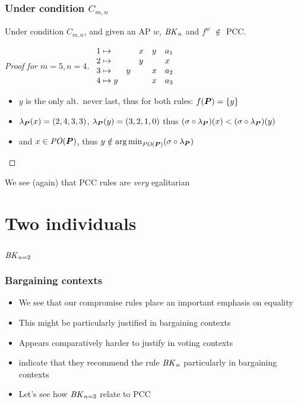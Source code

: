 \documentclass[french, english]{beamer}
\begin{document}
\begin{frame}
	\frametitle{Under condition \texorpdfstring{$C_{m, n}$}{C(m, n)}}
	\begin{theorem}
		Under condition $C_{m, n}$, and  given an AP $w$, $\BK[n]$ and $f^w$ $\notin$ PCC.
	\end{theorem}
	\begin{proof}[Proof for $m = 5, n = 4$]
		$\begin{array}{r@{\hspace{1mm} \mapsto \hspace{1mm}}lllll}
			1 &	&	&x	&y	&a_1\\%
			2 &	&	&y	&	&x\\%
			3 &	&y	&	&x	&a_2\\%
			4 &y	&	&	&x	&a_3\\%
		\end{array}$%
		\begin{itemize}
			\item $y$ is the only alt.\ never last, thus for both rules: $f(\boldsymbol{P}) = \{y\}$
			\item $\lambda_{\bm{P}}(x) = (2, 4, 3, 3)$, $\lambda_{\bm{P}}(y) = (3, 2, 1, 0)$ thus $(\sigma \circ \lambda_{\bm{P}})(x) < (\sigma \circ \lambda_{\bm{P}})(y)$
			\item and $x \in \mathit{PO}(\boldsymbol{P})$, thus $y \notin \operatorname*{arg\,min}_{\mathit{PO}(\boldsymbol{P})}(\sigma \circ \lambda_{\bm{P}})$ \qedhere
		\end{itemize}
	\end{proof}
	We see (again) that PCC rules are \emph{very} egalitarian
\end{frame}

\section{Two individuals}
\subsection{\texorpdfstring{$\BK[n = 2]$}{BK for two individuals}}
\begin{frame}
	\frametitle{Bargaining contexts}
	\begin{itemize}
		\item We see that our compromise rules place an important emphasis on equality
		\item This might be particularly justified in bargaining contexts
		\item Appears comparatively harder to justify in voting contexts
		\item \citet{Brams2001} indicate that they recommend the rule $\BK[n]$ particularly in bargaining contexts
		\item Let’s see how $\BK[n = 2]$ relate to PCC
	\end{itemize}
\end{frame}
\end{document}
